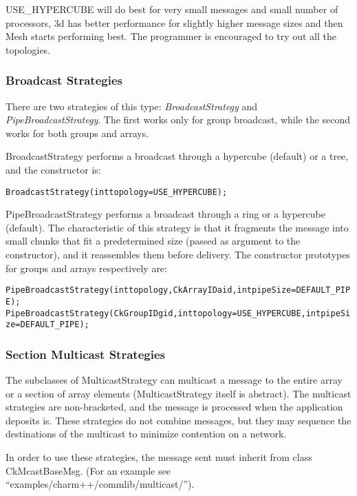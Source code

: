 {USE\_HYPERCUBE will do best for very small messages and small number of
processors, 3d has better performance for slightly higher message sizes and then
Mesh starts performing best. The programmer is encouraged to try out all the
topologies.


\subsubsection{Broadcast Strategies}

There are two strategies of this type: {\em BroadcastStrategy} and {\em
PipeBroadcastStrategy}. The first works only for group broadcast, while the
second works for both groups and arrays.

BroadcastStrategy performs a broadcast through a hypercube (default) or a tree,
and the constructor is:

\begin{alltt}
BroadcastStrategy(int topology=USE_HYPERCUBE);
\end{alltt}

PipeBroadcastStrategy performs a broadcast through a ring or a hypercube
(default). The characteristic of this strategy is that it fragments the message
into small chunks that fit a predetermined size (passed as argument to the
constructor), and it reassembles them before delivery. The constructor
prototypes for groups and arrays respectively are:

\begin{alltt}
PipeBroadcastStrategy(int topology, CkArrayID aid, int pipeSize=DEFAULT_PIPE);
PipeBroadcastStrategy(CkGroupID gid, int topology=USE_HYPERCUBE, int pipeSize=DEFAULT_PIPE);
\end{alltt}


\subsubsection{Section Multicast Strategies}

The subclasses of MulticastStrategy can multicast a message to the entire array
or a section of array elements (MulticastStrategy itself is abstract). The
multicast strategies are non-bracketed, and the message is processed when the
application deposits is. These strategies do not combine messages, but they may
sequence the destinations of the multicast to minimize contention on a network.

In order to use these strategies, the message sent must inherit from class
{\textrm{CkMcastBaseMsg}}. (For an example see
``examples/charm++/commlib/multicast/'').

}
